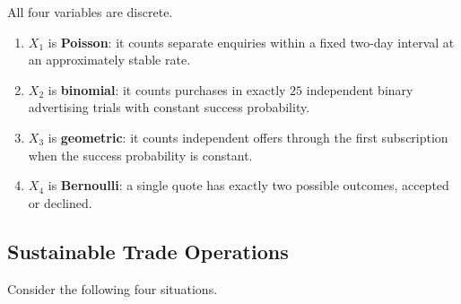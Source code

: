 	All four variables are discrete.
	\begin{enumerate}
		\item $X_1$ is \textbf{Poisson}: it counts separate enquiries within a fixed two-day interval at an approximately stable rate.
		\item $X_2$ is \textbf{binomial}: it counts purchases in exactly $25$ independent binary advertising trials with constant success probability.
		\item $X_3$ is \textbf{geometric}: it counts independent offers through the first subscription when the success probability is constant.
		\item $X_4$ is \textbf{Bernoulli}: a single quote has exactly two possible outcomes, accepted or declined.
	\end{enumerate}


	\subsection{Sustainable Trade Operations}
	\label{sec:sustainable-trade-operations}

	Consider the following four situations.

